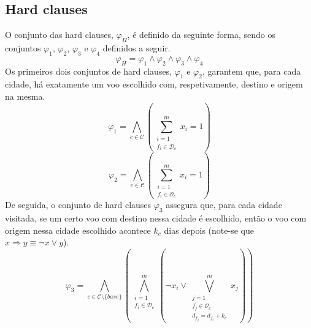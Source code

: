 \documentclass[12pt,a4paper]{article}
\begin{document}
    \subsection{Hard clauses}
        O conjunto das hard clauses, $\varphi_H$, é definido da seguinte forma, sendo os conjuntos $\varphi_1$, $\varphi_2$, $\varphi_3$ e $\varphi_4$ definidos a seguir.
        \begin{equation}
            \varphi_H = \varphi_1 \land \varphi_2 \land \varphi_3 \land \varphi_4
            \label{hard_clauses}
        \end{equation}
        Os primeiros dois conjuntos de hard clauses, $\varphi_1$ e $\varphi_2$, garantem que, para cada cidade, há exatamente um voo escolhido com, respetivamente, destino e origem na mesma.
        \begin{equation}
            \varphi_1 =
            \bigwedge_{c \in \mathcal{C}}
            \left(
            \sum_{\substack{i = 1 \\
                            f_i \in \mathcal{D}_c}}
                ^{m}
                {x_i} = 1
            \right)
            \label{destination_c}
        \end{equation}
        \begin{equation}
            \varphi_2 =
            \bigwedge_{c \in \mathcal{C}}
            \left(
            \sum_{\substack{i = 1 \\
                            f_i \in \mathcal{O}_c}}
                ^{m}
                {x_i} = 1
            \right)
            \label{origin_c}
        \end{equation}
        De seguida, o conjunto de hard clauses $\varphi_3$ assegura que, para cada cidade visitada, se um certo voo com destino nessa cidade é escolhido, então o voo com origem nessa cidade escolhido acontece $k_c$ dias depois (note-se que $x \Rightarrow y \equiv \neg x \lor y$).
        \begin{equation}
            \varphi_3 =
            \bigwedge_{c \in \mathcal{C} \setminus \{base\}}
            \left(
            \bigwedge_{\substack{i = 1 \\
                                 f_i \in \mathcal{D}_c}}
                     ^{m}
            \left(
            \neg x_i \lor
            \bigvee_{\substack{j = 1 \\
                               f_j \in \mathcal{O}_c \\
                               d_{f_j} = d_{f_i} + k_c}}
                ^{m}
                {x_j}
            \right)
            \right)
            \label{k_nights}
        \end{equation}
\end{document}

